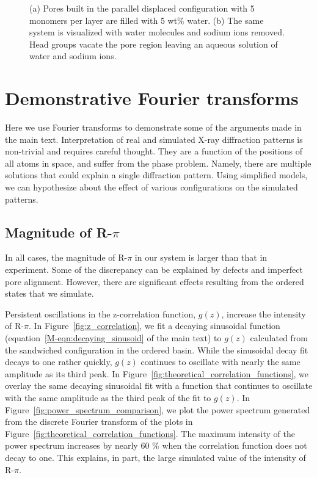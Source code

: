\documentclass[journal=jpcbfk,manusciprt=article]{achemso}
\begin{document}
\begin{figure}[!htb]
\begin{subfigure}{0.45\textwidth}
                \caption{}\label{fig:water_removed}
        \end{subfigure}
  \caption{(a) Pores built in the parallel displaced configuration with 5
	  monomers per layer are filled with 5 wt\% water. (b) The same system is
	  visualized with water molecules and sodium ions removed. Head groups vacate the
	  pore region leaving an aqueous solution of water and sodium ions.}\label{fig:water_pores}
  \end{figure}
  
  \section{Demonstrative Fourier transforms}\label{section:fourier}
  
  Here we use Fourier transforms to demonstrate some of the arguments made in 
  the main text. Interpretation of real and simulated X-ray diffraction patterns
  is non-trivial and requires careful thought. They are a function of the positions
  of all atoms in space, and suffer from the phase problem. Namely, there are multiple
  solutions that could explain a single diffraction pattern. Using simplified models, 
  we can hypothesize about the effect of various configurations on the simulated patterns.
  
  \subsection{Magnitude of R-$\pi$}\label{section:rpi_ft}
  
  In all cases, the magnitude of R-$\pi$ in our system is larger than that in experiment.
  Some of the discrepancy can be explained by defects and imperfect pore alignment. 
  However, there are significant effects resulting from the ordered states that we simulate.
  
  Persistent oscillations in the z-correlation function, $g(z)$, increase the intensity of R-$\pi$. 
  In Figure~\ref{fig:z_correlation}, we fit a decaying sinusoidal function 
  (equation~\ref{M-eqn:decaying_sinusoid} of the main text) to $g(z)$ calculated from the
  sandwiched configuration in the ordered basin. While the sinusoidal decay fit decays to one
  rather quickly, $g(z)$ continues to oscillate with nearly the same amplitude as its third peak. 
  In Figure~\ref{fig:theoretical_correlation_functions}, we overlay the same decaying sinusoidal
  fit with a function that continues to oscillate with the same amplitude as the third peak of
  the fit to $g(z)$. In Figure~\ref{fig:power_spectrum_comparison}, we plot the power spectrum
  generated from the discrete Fourier transform of the plots in Figure~\ref{fig:theoretical_correlation_functions}. 
  The maximum intensity of the power spectrum increases by nearly 60 \% when the correlation 
  function does not decay to one. This explains, in part, the large simulated value of the
  intensity of R-$\pi$.
  
\end{document}
